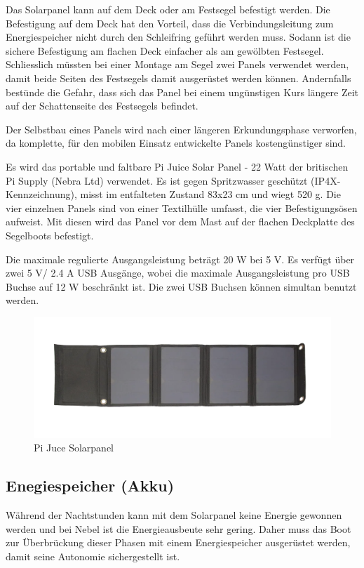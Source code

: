 Das Solarpanel kann auf dem Deck oder am Festsegel befestigt werden. Die Befestigung auf dem Deck hat den Vorteil, dass die Verbindungsleitung zum Energiespeicher nicht durch den Schleifring geführt werden muss. Sodann ist die sichere Befestigung am flachen Deck einfacher als am gewölbten Festsegel. Schliesslich müssten bei einer Montage am Segel zwei Panels verwendet werden, damit beide Seiten des Festsegels damit ausgerüstet werden können. Andernfalls bestünde die Gefahr, dass sich das Panel bei einem ungünstigen Kurs längere Zeit auf der Schattenseite des Festsegels befindet.  

Der Selbstbau eines Panels wird nach einer längeren Erkundungsphase verworfen, da komplette, für den mobilen Einsatz entwickelte Panels kostengünstiger sind.   

Es wird das portable und faltbare Pi Juice Solar Panel - 22 Watt der britischen Pi Supply (Nebra Ltd) verwendet. Es ist gegen Spritzwasser geschützt (IP4X-Kennzeichnung), misst im entfalteten Zustand 83x23 cm und wiegt 520 g. Die vier einzelnen Panels sind von einer Textilhülle umfasst, die vier Befestigungsösen aufweist. Mit diesen wird das Panel vor dem Mast auf der flachen Deckplatte des Segelboots befestigt.

Die maximale regulierte Ausgangsleistung beträgt 20 W bei 5 V. Es verfügt über zwei 5 V/ 2.4 A USB Ausgänge, wobei die maximale Ausgangsleistung pro USB Buchse auf 12 W beschränkt ist. Die zwei USB Buchsen können simultan benutzt werden.
\begin{figure}[H]
\centering
    \includegraphics[width=1\linewidth]{assets/Pi juce.png}
    \caption{Pi Juce Solarpanel}
    \label{fig:enter-label}
\end{figure}
\subsection{Enegiespeicher (Akku)}
Während der Nachtstunden kann mit dem Solarpanel keine Energie gewonnen werden und bei Nebel ist die Energieausbeute sehr gering. Daher muss das Boot zur Überbrückung dieser Phasen mit einem Energiespeicher ausgerüstet werden, damit seine Autonomie sichergestellt ist.

